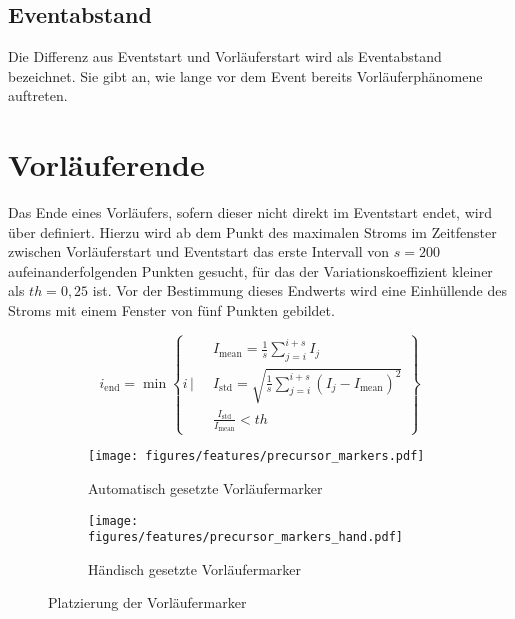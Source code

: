 \subsection{Eventabstand}
\label{sec:event_distance}
Die Differenz aus Eventstart und Vorläuferstart wird als Eventabstand bezeichnet. Sie gibt an, wie lange vor dem Event bereits Vorläuferphänomene auftreten.


\section{Vorläuferende}
\label{sec:preeventend}
Das Ende eines Vorläufers, sofern dieser nicht direkt im Eventstart endet, wird über  definiert. Hierzu wird ab dem Punkt des maximalen Stroms im Zeitfenster zwischen Vorläuferstart und Eventstart das erste Intervall von \(s = 200\) aufeinanderfolgenden Punkten gesucht, für das der Variationskoeffizient kleiner als \(th = 0{,}25\) ist. Vor der Bestimmung dieses Endwerts wird eine Einhüllende des Stroms mit einem Fenster von fünf Punkten gebildet.

\begin{equation}
i_{\text{end}} = \min \left\{ i \, \Bigg| \, 
\begin{aligned}
&  I_{\text{mean}} = \frac{1}{s}\sum_{j=i}^{i+s} I_j \\ 
&  I_{\text{std}} = \sqrt{\frac{1}{s}\sum_{j=i}^{i+s} (I_j - I_{\text{mean}})^2} \\ 
&  \frac{I_{\text{std}}}{I_{\text{mean}}} < th
\end{aligned}
\right\}
\label{eq:precursor_end}
\end{equation}

\begin{figure}[H]
  \centering
  \begin{subfigure}[t]{0.48\textwidth}
    \centering
    \texttt{[image: figures/features/precursor\_markers.pdf]}
    \caption{Automatisch gesetzte Vorläufermarker}
    \label{fig:precursor_markers_auto}
  \end{subfigure}
  \begin{subfigure}[t]{0.48\textwidth}
    \centering
    \texttt{[image: figures/features/precursor\_markers\_hand.pdf]}
    \caption{Händisch gesetzte Vorläufermarker}
    \label{fig:precursor_markers_hand}
  \end{subfigure}
  \caption{Platzierung der Vorläufermarker}
  \label{fig:precursor_markers}
\end{figure}

